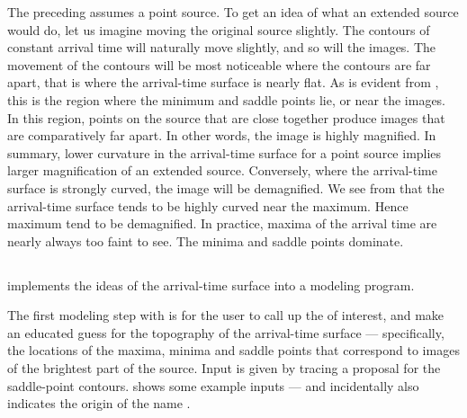 The preceding assumes a point source.  To get an idea of what an
extended source would do, let us imagine moving the original source
slightly.  The contours of constant arrival time will naturally move
slightly, and so will the images.  The movement of the contours will
be most noticeable where the contours are far apart, that is where the
arrival-time surface is nearly flat.  As is evident from
, this is the region where the minimum and saddle points
lie, or near the images.  In this region, points on the source that
are close together produce images that are comparatively far apart.
In other words, the image is highly magnified.  In summary, lower
curvature in the arrival-time surface for a point source implies
larger magnification of an extended source.  Conversely, where the
arrival-time surface is strongly curved, the image will be
demagnified.  We see from  that the arrival-time surface
tends to be highly curved near the maximum.  Hence maximum tend to be
demagnified.  In practice, maxima of the arrival time are nearly
always too faint to see. The minima and saddle points dominate.

\subsection{\spl} \label{sec:SpaghettiLens}

\spl implements the ideas of the arrival-time surface into a modeling
program.

The first modeling step with \spl is for the user to call up the \sw
of interest, and make an educated guess for the topography of the
arrival-time surface --- specifically, the locations of the maxima,
minima and saddle points that correspond to images of the brightest
part of the source.  Input is given by tracing a proposal for the
saddle-point contours.   shows some example
inputs --- and incidentally also indicates the origin of the name
\spl.

